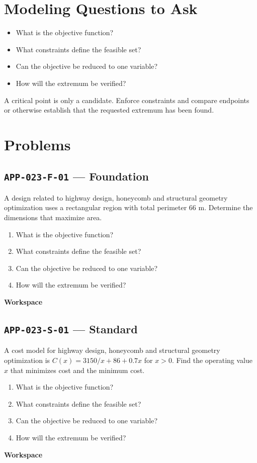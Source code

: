 \documentclass[11pt]{book}
\newcommand{\pid}[1]{\texttt{#1}}
\newcommand{\workspace}{\par\vspace{0.7in}\hrulefill\par\vspace{0.55in}\hrulefill\par}
\begin{document}
\section*{Modeling Questions to Ask}\begin{itemize}
\item What is the objective function?
\item What constraints define the feasible set?
\item Can the objective be reduced to one variable?
\item How will the extremum be verified?
\end{itemize}
\begin{errorbox}A critical point is only a candidate. Enforce constraints and compare endpoints or otherwise establish that the requested extremum has been found.\end{errorbox}
\section*{Problems}
\subsection*{\pid{APP-023-F-01} — Foundation}
\begin{problembox}
A design related to highway design, honeycomb and structural geometry optimization uses a rectangular region with total perimeter 66 m. Determine the dimensions that maximize area.
\end{problembox}
\begin{promptbox}\begin{enumerate}
\item What is the objective function?
\item What constraints define the feasible set?
\item Can the objective be reduced to one variable?
\item How will the extremum be verified?
\end{enumerate}\end{promptbox}
\textbf{Workspace}\workspace
{}
\subsection*{\pid{APP-023-S-01} — Standard}
\begin{problembox}
A cost model for highway design, honeycomb and structural geometry optimization is $C(x)=3150/x+86+0.7x$ for $x>0$. Find the operating value $x$ that minimizes cost and the minimum cost.
\end{problembox}
\begin{promptbox}\begin{enumerate}
\item What is the objective function?
\item What constraints define the feasible set?
\item Can the objective be reduced to one variable?
\item How will the extremum be verified?
\end{enumerate}\end{promptbox}
\textbf{Workspace}\workspace
{}
\end{document}
